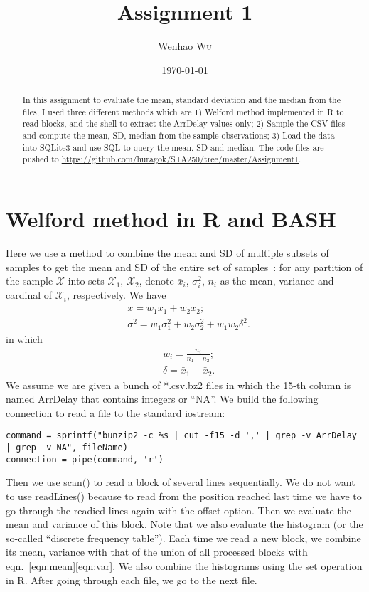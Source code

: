\documentclass{article}
\title{Assignment 1} %
\author{Wenhao \textsc{Wu}} %
\date{\today} %
\begin{document}
\maketitle %

\begin{abstract}
  In this assignment to evaluate the mean, standard deviation and the median from the files, I used three different methods which are 1)  Welford method implemented in R to read blocks, and the shell to extract the ArrDelay values only; 2) Sample the CSV files and compute the mean, SD, median from the sample observations; 3) Load the data into SQLite3 and use SQL to query the mean, SD and median. The code files are pushed to \url{https://github.com/huragok/STA250/tree/master/Assignment1}.
\end{abstract}

\section{Welford method in R and BASH}
\lstset{language=R,breaklines=true}
Here we use a method to combine the mean and SD of multiple subsets of samples to get the mean and SD of the entire set of samples~\cite{Welford}: for any partition of the sample $\mathcal{X}$ into sets $\mathcal{X}_1$, $\mathcal{X}_2$, denote $\bar{x}_i$, $\sigma^2_i$, $n_i$ as the mean, variance and cardinal of $\mathcal{X}_i$, respectively. We have
\begin{align}
    &\bar{x} = w_1 \bar{x}_1 + w_2 \bar{x}_2; \label{eqn:mean}\\
    &\sigma^2 = w_1 \sigma^2_1 + w_2 \sigma^2_2 +  w_1 w_2\delta^2 \label{eqn:var}.
\end{align}
in which
\begin{align}
    &w_i = \frac{n_i}{n_1+n_2}; \\
    &\delta = \bar{x}_1- \bar{x}_2.
\end{align}
We assume we are given a bunch of *.csv.bz2 files in which the 15-th column is named ArrDelay that contains integers or ``NA''. We build the following connection to read a file to the standard iostream:
\begin{lstlisting}
command = sprintf("bunzip2 -c %s | cut -f15 -d ',' | grep -v ArrDelay | grep -v NA", fileName)
connection = pipe(command, 'r')
\end{lstlisting}
Then we use scan() to read a block of several lines sequentially. We do not want to use readLines() because to read from the position reached last time we have to go through the readied lines again with the offset option. Then we evaluate the mean and variance of this block. Note that we also evaluate the histogram (or the so-called ``discrete frequency table''). Each time we read a new block, we combine its mean, variance with that of the union of all processed blocks with eqn.~\ref{eqn:mean}\ref{eqn:var}. We also combine the histograms using the set operation in R. After going through each file, we go to the next file.
\end{document}

